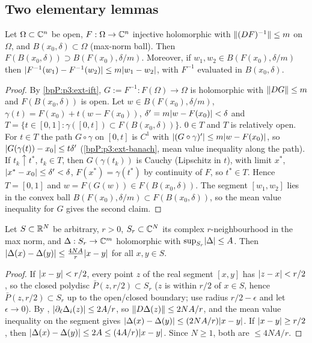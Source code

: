 \subsection{Two elementary lemmas}\label{bpP:p3:elem}

\begin{lemma}\label{bpP:p3:ball}
Let $\Omega\subset\mathbb{C}^n$ be open, $F:\Omega\to\mathbb{C}^n$ injective holomorphic with $\lVert (DF)^{-1}\rVert\le m$ on $\Omega$, and $B(x_0,\delta)\subset\Omega$ (max-norm ball). Then $F(B(x_0,\delta))\supset B(F(x_0),\delta/m)$. Moreover, if $w_1,w_2\in B(F(x_0),\delta/m)$ then $\lvert F^{-1}(w_1)-F^{-1}(w_2)\rvert\le m\lvert w_1-w_2\rvert$, with $F^{-1}$ evaluated in $B(x_0,\delta)$.
\end{lemma}
\begin{proof}
\label{stepP:p3:ball-inv}
By \ref{bpP:p3:ext-ift}, $G:=F^{-1}:F(\Omega)\to\Omega$ is holomorphic with $\lVert DG\rVert\le m$ and $F(B(x_0,\delta))$ is open.
\label{stepP:p3:ball-lift}
Let $w\in B(F(x_0),\delta/m)$, $\gamma(t)=F(x_0)+t(w-F(x_0))$, $\delta'=m\lvert w-F(x_0)\rvert<\delta$ and $T=\{t\in[0,1]:\gamma([0,t])\subset F(B(x_0,\delta))\}$. $0\in T$ and $T$ is relatively open. For $t\in T$ the path $G\circ\gamma$ on $[0,t]$ is $C^1$ with $\lvert (G\circ\gamma)'\rvert\le m\lvert w-F(x_0)\rvert$, so $\lvert G(\gamma(t))-x_0\rvert\le t\delta'$ (\ref{bpP:p3:ext-banach}, mean value inequality along the path).
\label{stepP:p3:ball-closed}
If $t_k\uparrow t^*$, $t_k\in T$, then $G(\gamma(t_k))$ is Cauchy (Lipschitz in $t$), with limit $x^*$, $\lvert x^*-x_0\rvert\le\delta'<\delta$, $F(x^*)=\gamma(t^*)$ by continuity of $F$, so $t^*\in T$. Hence $T=[0,1]$ and $w=F(G(w))\in F(B(x_0,\delta))$.
\label{stepP:p3:ball-lip}
The segment $[w_1,w_2]$ lies in the convex ball $B(F(x_0),\delta/m)\subset F(B(x_0,\delta))$, so the mean value inequality for $G$ gives the second claim.
\end{proof}

\begin{lemma}\label{bpP:p3:lip-sup}
Let $S\subset\mathbb{R}^N$ be arbitrary, $r>0$, $S_r\subset\mathbb{C}^N$ its complex $r$-neighbourhood in the max norm, and $\Delta:S_r\to\mathbb{C}^m$ holomorphic with $\sup_{S_r}\lvert \Delta\rvert\le A$. Then $\lvert \Delta(x)-\Delta(y)\rvert\le\frac{4NA}{r}\lvert x-y\rvert$ for all $x,y\in S$.
\end{lemma}
\begin{proof}
\label{stepP:p3:ls-close}
If $\lvert x-y\rvert<r/2$, every point $z$ of the real segment $[x,y]$ has $\lvert z-x\rvert<r/2$, so the closed polydisc $\bar P(z,r/2)\subset S_r$ ($z$ is within $r/2$ of $x\in S$, hence $\bar P(z,r/2)\subset S_{r}$ up to the open/closed boundary; use radius $r/2-\epsilon$ and let $\epsilon\to0$). By , $\lvert \partial_\ell\Delta_i(z)\rvert\le2A/r$, so $\lVert D\Delta(z)\rVert\le2NA/r$, and the mean value inequality on the segment gives $\lvert \Delta(x)-\Delta(y)\rvert\le(2NA/r)\lvert x-y\rvert$.
\label{stepP:p3:ls-far}
If $\lvert x-y\rvert\ge r/2$, then $\lvert \Delta(x)-\Delta(y)\rvert\le2A\le(4A/r)\lvert x-y\rvert$. Since $N\ge1$, both are $\le4NA/r$.
\end{proof}


